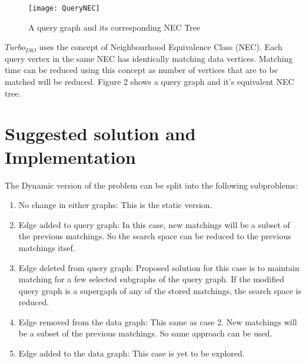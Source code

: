 \documentclass[
10pt, %
a4paper, %
oneside, %
headinclude,footinclude, %
BCOR5mm, %
]{scrartcl}
\begin{document}
\begin{figure}[H]
\centering 
\texttt{[image: QueryNEC]} 
\caption[Query graph and NEC Tree]{A query graph and its corresponding NEC Tree} %
\label{fig:gallery} 
\end{figure}


$Turbo_{ISO}$ uses the concept of Neighbourhood Equivalence Class (NEC). Each query vertex in the same NEC has identically matching data vertices. Matching time can be reduced using this concept as number of vertices that are to be matched will be reduced. Figure 2 shows a query graph and it's equivalent NEC tree.






\section{Suggested solution and Implementation}

The Dynamic version of the problem can be split into the following subproblems:

\begin{enumerate}
    \item No change in either graphs: This is the static version.
    \item Edge added to query graph: In this case, new matchings will be a subset of the previous matchings. So the search space can be reduced to the previous matchings itsef.
    \item Edge deleted from query graph: Proposed solution for this case is to maintain matching for a few selected subgraphs of the query graph. If the modified query graph is a supergaph of any of the stored matchings, the search space is reduced.
    \item Edge removed from the data graph: This same as case 2. New matchings will be a subset of the previous matchings. So same approach can be used.
    \item Edge added to the data graph: This case is yet to be explored.
\end{enumerate}
\end{document}
